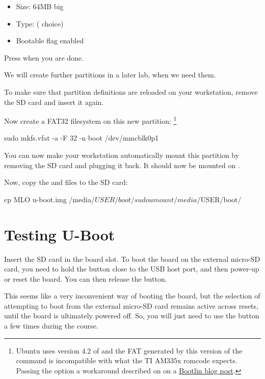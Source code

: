 \begin{itemize}
\item Size: 64MB big
\item Type:  ( choice)
\item Bootable flag enabled
\end{itemize}

Press  when you are done.

We will create further partitions in a later lab, when we need them.

To make sure that partition definitions are reloaded on your
workstation, remove the SD card and insert it again.

Now create a FAT32 filesystem on this new partition:
\footnote{Ubuntu uses version 4.2 of  and the FAT
generated by this version of the command is incompatible with what
the TI AM335x romcode expects. Passing the  option
a workaround described on on a \href{https://bootlin.com/blog/workaround-for-creating-bootable-fat-partition-for-beagle-bone-am335x-on-recent-distros/}
{Bootlin blog post}.}
\begin{bashinput}
sudo mkfs.vfat -a -F 32 -n boot /dev/mmcblk0p1
\end{bashinput}

You can now make your workstation automatically mount this
partition by removing the SD card and plugging it back. It should
now be mounted on .

Now, copy the  and  files to the SD card:
\begin{bashinput}
cp MLO u-boot.img /media/$USER/boot/
sudo umount /media/$USER/boot/
\end{bashinput}

\section{Testing U-Boot}

Insert the SD card in the board slot. To boot the board on the external micro-SD
card, you need to hold the  button close to the USB host
port, and then power-up or reset the board. You can then release the
 button.

This seems like a very inconvenient way of booting the board, but
the selection of attempting to boot from the external micro-SD card
remains active across resets, until the board is ultimately powered off.
So, you will just need to use the button a few times during the course.

